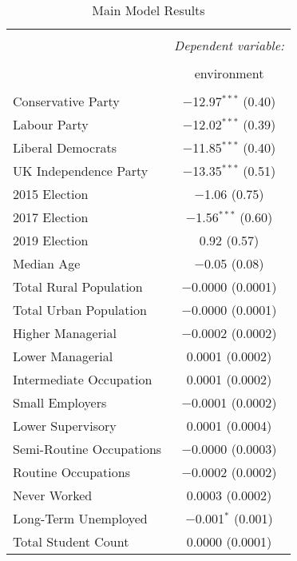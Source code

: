 \documentclass[12pt,letterpaper]{article}
\begin{document}
\thispagestyle{special}



\begin{table}[!htbp] \centering 
	\caption{Main Model Results} 
	\label{tab:main_model} 
	\footnotesize 
	\begin{tabular}{@{\extracolsep{5pt}}lc} 
		\\[-1.8ex]\hline 
		\hline \\[-1.8ex] 
		& \multicolumn{1}{c}{\textit{Dependent variable:}} \\ 
		\cline{2-2} 
		\\[-1.8ex] & environment \\ 
		\hline \\[-1.8ex] 
		Conservative Party & $-$12.97$^{***}$ (0.40) \\ 
		Labour Party & $-$12.02$^{***}$ (0.39) \\ 
		Liberal Democrats & $-$11.85$^{***}$ (0.40) \\ 
		UK Independence Party & $-$13.35$^{***}$ (0.51) \\ 
		2015 Election & $-$1.06 (0.75) \\ 
		2017 Election & $-$1.56$^{***}$ (0.60) \\ 
		2019 Election & 0.92 (0.57) \\ 
		Median Age & $-$0.05 (0.08) \\ 
		Total Rural Population & $-$0.0000 (0.0001) \\ 
		Total Urban Population & $-$0.0000 (0.0001) \\ 
		Higher Managerial& $-$0.0002 (0.0002) \\ 
		Lower Managerial & 0.0001 (0.0002) \\ 
		Intermediate Occupation & 0.0001 (0.0002) \\ 
		Small Employers & $-$0.0001 (0.0002) \\ 
		Lower Supervisory & 0.0001 (0.0004) \\ 
		Semi-Routine Occupations& $-$0.0000 (0.0003) \\ 
		Routine Occupations & $-$0.0002 (0.0002) \\ 
		Never Worked & 0.0003 (0.0002) \\ 
		Long-Term Unemployed & $-$0.001$^{*}$ (0.001) \\ 
		Total Student Count & 0.0000 (0.0001) \\ 

\end{tabular}
\end{table}
\end{document}

